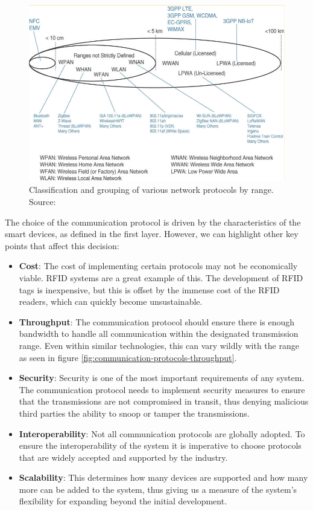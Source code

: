 \begin{figure}[H]
    \centering
    \includegraphics[width=0.85\linewidth]{images/communication-protocols.png}
    \caption[Classification and grouping of various network protocols by range.]{ Classification and grouping of various network protocols by range. Source: \cite{10.5555/3161403}}
    \label{fig:communication-protocols}
\end{figure}


The choice of the communication protocol is driven by the characteristics of the smart devices, as defined in the first layer. However, we can highlight other key points that affect this decision:

\begin{itemize}
    \item \textbf{Cost}: The cost of implementing certain protocols may not be economically viable. \acs{RFID} systems are a great example of this. The development of \acs{RFID} tags is inexpensive, but this is offset by the immense cost of the \acs{RFID} readers, which can quickly become unsustainable.
    \item \textbf{Throughput}: The communication protocol should ensure there is enough bandwidth to handle all communication within the designated transmission range. Even within similar technologies, this can vary wildly with the range as seen in figure \ref{fig:communication-protocols-throughput}.
    \item \textbf{Security}: Security is one of the most important requirements of any system. The communication protocol needs to implement security measures to ensure that the transmissions are not compromised in transit, thus denying malicious third parties the ability to snoop or tamper the transmissions. 
    \item \textbf{Interoperability}: Not all communication protocols are globally adopted. To ensure the interoperability of the system it is imperative to choose protocols that are widely accepted and supported by the industry.%
    \item \textbf{Scalability}: This determines how many devices are supported and how many more can be added to the system, thus giving us a measure of the system's flexibility for expanding beyond the initial development.
\end{itemize}

